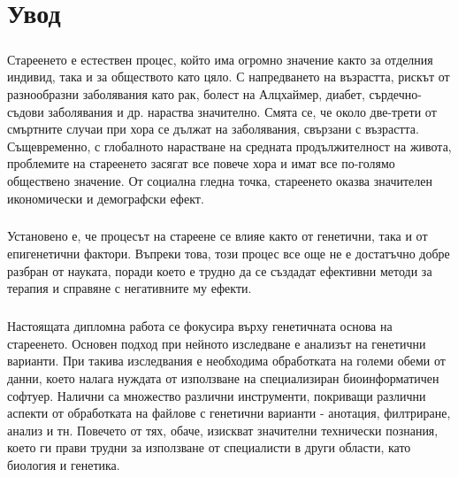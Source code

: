 \documentclass[pdftex,cyrillic,14pt,a4page,twoside]{extreport}
\newcommand\blankpage{%
    \null
    \thispagestyle{empty}%
    \newpage}
\begin{document}
\afterpage{\blankpage}


\tableofcontents
\pagebreak
\afterpage{\blankpage}

\setlength\parindent{0pt}

\chapter{Увод}
\paragraph{}

Стареенето е естествен процес, който има огромно значение както за отделния индивид, така и за обществото като цяло. С напредването на възрастта, рискът от разнообразни заболявания като рак, болест на Алцхаймер, диабет, сърдечно-съдови заболявания и др. нараства значително. Смята се, че около две-трети от смъртните случаи при хора се дължат на заболявания, свързани с възрастта. Същевременно, с глобалното нарастване на средната продължителност на живота, проблемите на стареенето засягат все повече хора и имат все по-голямо обществено значение. От социална гледна точка, стареенето оказва значителен икономически и демографски ефект.

\paragraph{}
Установено е, че процесът на стареене се влияе както от генетични, така и от епигенетични фактори. Въпреки това, този процес все още не е достатъчно добре разбран от науката, поради което е трудно да се създадат ефективни методи за терапия и справяне с негативните му ефекти.

\paragraph{}
Настоящата дипломна работа се фокусира върху генетичната основа на стареенето. Основен подход при нейното изследване е анализът на генетични варианти. При такива изследвания е необходима обработката на големи обеми от данни, което налага нуждата от използване на специализиран биоинформатичен софтуер. Налични са множество различни инструменти, покриващи различни аспекти от обработката на файлове с генетични варианти - анотация, филтриране, анализ и тн. Повечето от тях, обаче, изискват значителни технически познания, което ги прави трудни за използване от специалисти в други области, като биология и генетика.
\end{document}
